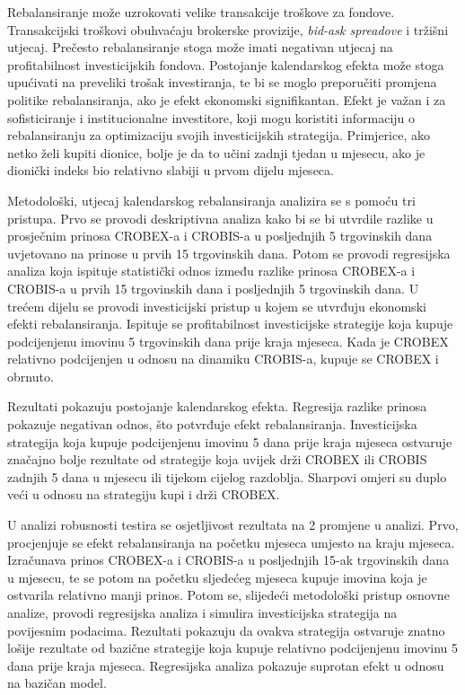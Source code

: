 \documentclass[
  letterpaper,
  DIV=11,
  numbers=noendperiod]{scrartcl}
\begin{document}
Rebalansiranje može uzrokovati velike transakcije troškove za fondove.
Transakcijski troškovi obuhvaćaju brokerske provizije, \emph{bid-ask
spreadove} i tržišni utjecaj. Prečesto rebalansiranje stoga može imati
negativan utjecaj na profitabilnost investicijskih fondova. Postojanje
kalendarskog efekta može stoga upućivati na preveliki trošak
investiranja, te bi se moglo preporučiti promjena politike
rebalansiranja, ako je efekt ekonomski signifikantan. Efekt je važan i
za sofisticiranje i institucionalne investitore, koji mogu koristiti
informaciju o rebalansiranju za optimizaciju svojih investicijskih
strategija. Primjerice, ako netko želi kupiti dionice, bolje je da to
učini zadnji tjedan u mjesecu, ako je dionički indeks bio relativno
slabiji u prvom dijelu mjeseca.

Metodološki, utjecaj kalendarskog rebalansiranja analizira se s pomoću
tri pristupa. Prvo se provodi deskriptivna analiza kako bi se bi
utvrdile razlike u prosječnim prinosa CROBEX-a i CROBIS-a u posljednjih
5 trgovinskih dana uvjetovano na prinose u prvih 15 trgovinskih dana.
Potom se provodi regresijska analiza koja ispituje statistički odnos
između razlike prinosa CROBEX-a i CROBIS-a u prvih 15 trgovinskih dana i
posljednjih 5 trgovinskih dana. U trećem dijelu se provodi investicijski
pristup u kojem se utvrđuju ekonomski efekti rebalansiranja. Ispituje se
profitabilnost investicijske strategije koja kupuje podcijenjenu imovinu
5 trgovinskih dana prije kraja mjeseca. Kada je CROBEX relativno
podcijenjen u odnosu na dinamiku CROBIS-a, kupuje se CROBEX i obrnuto.

Rezultati pokazuju postojanje kalendarskog efekta. Regresija razlike
prinosa pokazuje negativan odnos, što potvrđuje efekt rebalansiranja.
Investicijska strategija koja kupuje podcijenjenu imovinu 5 dana prije
kraja mjeseca ostvaruje značajno bolje rezultate od strategije koja
uvijek drži CROBEX ili CROBIS zadnjih 5 dana u mjesecu ili tijekom
cijelog razdoblja. Sharpovi omjeri su duplo veći u odnosu na strategiju
kupi i drži CROBEX.

U analizi robusnosti testira se osjetljivost rezultata na 2 promjene u
analizi. Prvo, procjenjuje se efekt rebalansiranja na početku mjeseca
umjesto na kraju mjeseca. Izračunava prinos CROBEX-a i CROBIS-a u
posljednjih 15-ak trgovinskih dana u mjesecu, te se potom na početku
sljedećeg mjeseca kupuje imovina koja je ostvarila relativno manji
prinos. Potom se, slijedeći metodološki pristup osnovne analize, provodi
regresijska analiza i simulira investicijska strategija na povijesnim
podacima. Rezultati pokazuju da ovakva strategija ostvaruje znatno
lošije rezultate od bazične strategije koja kupuje relativno
podcijenjenu imovinu 5 dana prije kraja mjeseca. Regresijska analiza
pokazuje suprotan efekt u odnosu na bazičan model.
\end{document}
